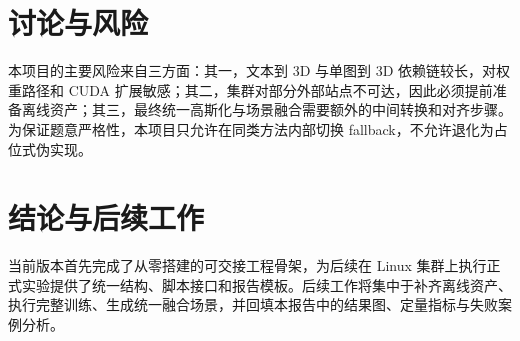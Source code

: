 \documentclass{article}
\begin{document}
\section{讨论与风险}
本项目的主要风险来自三方面：其一，文本到 3D 与单图到 3D 依赖链较长，对权重路径和 CUDA 扩展敏感；其二，集群对部分外部站点不可达，因此必须提前准备离线资产；其三，最终统一高斯化与场景融合需要额外的中间转换和对齐步骤。为保证题意严格性，本项目只允许在同类方法内部切换 fallback，不允许退化为占位式伪实现。

\section{结论与后续工作}
当前版本首先完成了从零搭建的可交接工程骨架，为后续在 Linux 集群上执行正式实验提供了统一结构、脚本接口和报告模板。后续工作将集中于补齐离线资产、执行完整训练、生成统一融合场景，并回填本报告中的结果图、定量指标与失败案例分析。



\end{document}
